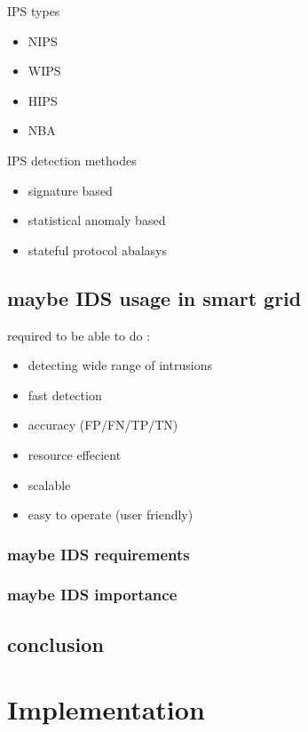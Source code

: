IPS types
\firmlist
\begin{itemize}
	\item NIPS
	\item WIPS
	\item HIPS
	\item NBA
\end{itemize}

IPS detection methodes

\firmlist
\begin{itemize}
	\item signature based
	\item statistical anomaly based
	\item stateful protocol abalasys 
\end{itemize}

\section{maybe IDS usage in smart grid}
required to be able to do :

\firmlist
\begin{itemize}
	\item detecting wide range of intrusions
	\item fast detection
	\item accuracy (FP/FN/TP/TN)
	\item resource effecient
	\item scalable
	\item easy to operate (user friendly)
\end{itemize}


\subsection{maybe IDS requirements}

\subsection{maybe IDS importance}


\section{conclusion}













\chapter{Implementation} \label{chap:Implementation}
